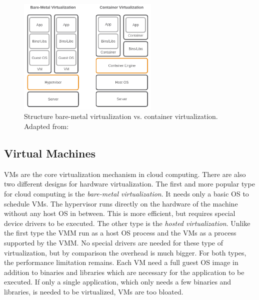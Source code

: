 \begin{figure}[H]
    \centering
    \includegraphics[width=0.6\textwidth]{resources/images/vm_vs_container.png}
    \caption[Structure bare-metal virtualization vs. container virtualization]{Structure bare-metal virtualization vs. container virtualization. Adapted from: \autocite[p. 2]{Gallagher:2015}}
    \label{fig:vms_vs_docker}
\end{figure}


\subsection{Virtual Machines}
\acp{VM} are the core virtualization mechanism in cloud computing.
There are also two different designs for hardware virtualization.
The first and more popular type for cloud computing is the \textit{bare-metal virtualization}.
It needs only a basic OS to schedule \acp{VM}.
The hypervisor runs directly on the hardware of the machine without any host \ac{OS} in between.
This is more efficient, but requires special device drivers to be executed.
The other type is the \textit{hosted virtualization}.
Unlike the first type the \ac{VMM} run as a host \ac{OS} process and the \acp{VM} as a process supported by the \ac{VMM}.
No special drivers are needed for these type of virtualization, but by comparison the overhead is much bigger.
For both types, the performance limitation remains.
Each \ac{VM} need a full guest \ac{OS} image in addition to binaries and libraries which are necessary for the application to be executed.\autocite[cf.][p. 381]{Pahl:2015}
If only a single application, which only needs a few binaries and libraries, is needed to be virtualized, \acp{VM} are too bloated.


